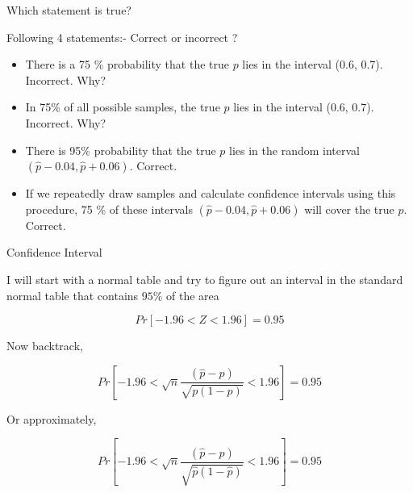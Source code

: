 \documentclass{beamer}\usepackage[]{graphicx}\usepackage[]{color}
\begin{document}
\begin{frame}{Which statement is true?}

 Following 4 statements:- Correct or incorrect ? \pause
    \begin{itemize}
    \item There is a 75 \% probability that the true $p$
      lies in the interval (0.6, 0.7). \pause Incorrect. \pause Why? \pause
    \item In 75\% of all possible samples, the true $p$
      lies in the interval (0.6, 0.7). \pause Incorrect. \pause Why? \pause

    \item There is 95\% probability that the true $p$ lies in the random interval $(\hat{p} - 0.04, \hat{p}+0.06)$. \pause Correct. \pause
    \item If we repeatedly draw samples and calculate confidence
      intervals using this procedure, 75 \% of these intervals $         (\hat{p} - 0.04, \hat{p}+0.06)$ will
      cover the true $p$. \pause Correct.
\end{itemize}

\end{frame}


\begin{frame}{Confidence Interval}

I will start with a normal table and try to figure out an interval in the standard normal table that contains $95 \%$ of the area

$$ Pr \left [ -1.96 < Z < 1.96  \right] = 0.95 $$ \pause 

Now backtrack, 

$$ Pr \left [ - 1.96 < \sqrt{n}\frac{(\hat{p} - p)}{\sqrt{p(1-p)}} < 1.96 \right] = 0.95 $$ \pause

Or approximately, 

$$ Pr \left [ - 1.96 < \sqrt{n}\frac{(\hat{p} - p)}{\sqrt{\hat{p}(1-\hat{p})}} < 1.96 \right] = 0.95 $$

\end{frame}
\end{document}

